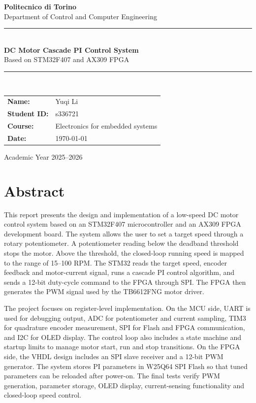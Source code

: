 \documentclass[12pt, a4paper]{report}
\begin{document}
\begin{titlepage}
  \centering
  \vspace*{2cm}
  {\Large\textbf{Politecnico di Torino}}\\[0.5cm]
  {\large Department of Control and Computer Engineering}\\[2cm]
  \rule{\linewidth}{0.5pt}\\[0.5cm]
  {\LARGE\textbf{DC Motor Cascade PI Control System}}\\[0.3cm]
  {\large Based on STM32F407 and AX309 FPGA}\\[0.5cm]
  \rule{\linewidth}{0.5pt}\\[2cm]
  {\large\begin{tabular}{ll}
    \textbf{Name:}       & Yuqi Li \\[0.3cm]
    \textbf{Student ID:} & s336721 \\[0.3cm]
    \textbf{Course:}     & Electronics for embedded systems \\[0.3cm]
    \textbf{Date:}       & \today \\
  \end{tabular}}
  \vfill
  {\small Academic Year 2025--2026}
\end{titlepage}


\chapter*{Abstract}

This report presents the design and implementation of a low-speed DC motor control system based on an STM32F407 microcontroller and an AX309 FPGA development board. The system allows the user to set a target speed through a rotary potentiometer. A potentiometer reading below the deadband threshold stops the motor. Above the threshold, the closed-loop running speed is mapped to the range of 15--100 RPM. The STM32 reads the target speed, encoder feedback and motor-current signal, runs a cascade PI control algorithm, and sends a 12-bit duty-cycle command to the FPGA through SPI. The FPGA then generates the PWM signal used by the TB6612FNG motor driver.

The project focuses on register-level implementation. On the MCU side, UART is used for debugging output, ADC for potentiometer and current sampling, TIM3 for quadrature encoder measurement, SPI for Flash and FPGA communication, and I2C for OLED display. The control loop also includes a state machine and startup limits to manage motor start, run and stop transitions. On the FPGA side, the VHDL design includes an SPI slave receiver and a 12-bit PWM generator. The system stores PI parameters in W25Q64 SPI Flash so that tuned parameters can be reloaded after power-on. The final tests verify PWM generation, parameter storage, OLED display, current-sensing functionality and closed-loop speed control.
\\
\end{document}
